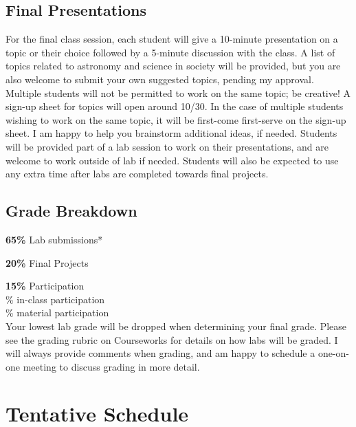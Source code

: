 \documentclass[11pt]{article}
\begin{document}
\smallskip

\subsection*{Final Presentations}

\noindent For the final class session, each student will give a 10-minute presentation on a topic or their choice followed by a 5-minute discussion with the class. A list of topics related to astronomy and science in society will be provided, but you are also welcome to submit your own suggested topics, pending my approval. \\

Multiple students will not be permitted to work on the same topic; be creative! A sign-up sheet for topics will open around 10/30. In the case of multiple students wishing to work on the same topic, it will be first-come first-serve on the sign-up sheet. I am happy to help you brainstorm additional ideas, if needed. Students will be provided part of a lab session to work on their presentations, and are welcome to work outside of lab if needed. Students will also be expected to use any extra time after labs are completed towards final projects. \\

\subsection*{Grade Breakdown}

\noindent \textbf{65\%} Lab submissions*

\noindent \textbf{20\%} Final Projects

\noindent \textbf{15\%} Participation \\
\% in-class participation \\
\% material participation \\

\noindent *Your lowest lab grade will be dropped when determining your final grade. Please see the grading rubric on Courseworks for details on how labs will be graded. I will always provide comments when grading, and am happy to schedule a one-on-one meeting to discuss grading in more detail.

\section*{Tentative Schedule}
\end{document}
